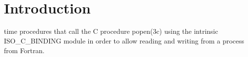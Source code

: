    

    \hypertarget{index_Introduction}{}\section{Introduction}\label{index_Introduction}
time procedures that call the C procedure popen(3c) using the intrinsic I\+S\+O\+\_\+\+C\+\_\+\+B\+I\+N\+D\+I\+NG module in order to allow reading and writing from a process from Fortran.

      